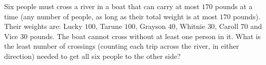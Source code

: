 Six people must cross a river in a boat that can carry at most $170$ pounds at a time (any number of people, as long as their total weight is at most $170$ pounds). Their weights are: Lucky $100$, Tarune $100$, Grayson $40$, Whitnie $30$, Caroll $70$ and Vice $30$ pounds. The boat cannot cross without at least one person in it. What is the least number of crossings (counting each trip across the river, in either direction) needed to get all six people to the other side?
